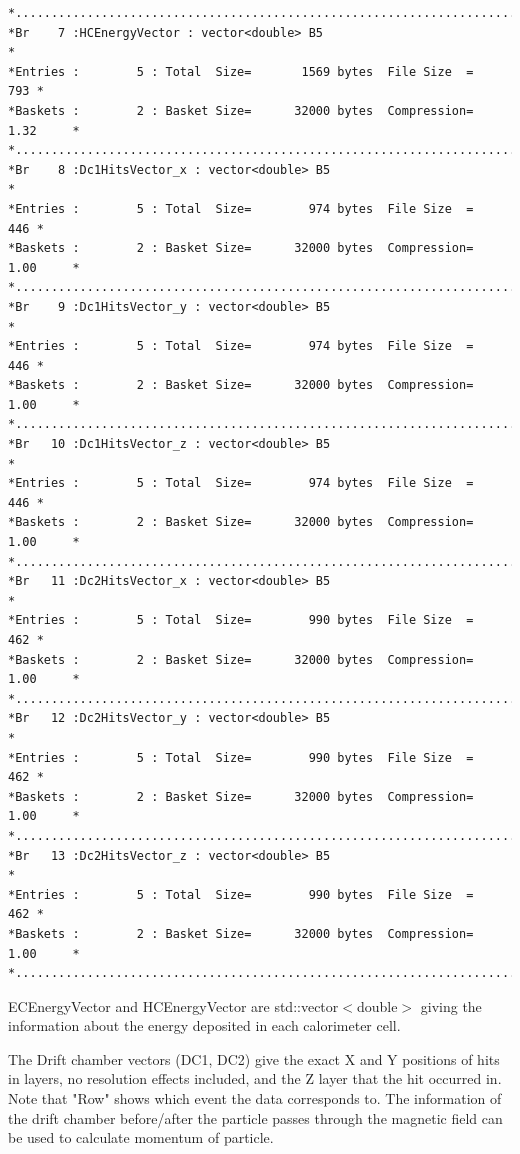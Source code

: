 \documentclass[a4paper,11pt,twoside]{article}
\begin{document}
\begin{lstlisting}
*............................................................................*
*Br    7 :HCEnergyVector : vector<double> B5                                 *
*Entries :        5 : Total  Size=       1569 bytes  File Size  =        793 *
*Baskets :        2 : Basket Size=      32000 bytes  Compression=   1.32     *
*............................................................................*
*Br    8 :Dc1HitsVector_x : vector<double> B5                                *
*Entries :        5 : Total  Size=        974 bytes  File Size  =        446 *
*Baskets :        2 : Basket Size=      32000 bytes  Compression=   1.00     *
*............................................................................*
*Br    9 :Dc1HitsVector_y : vector<double> B5                                *
*Entries :        5 : Total  Size=        974 bytes  File Size  =        446 *
*Baskets :        2 : Basket Size=      32000 bytes  Compression=   1.00     *
*............................................................................*
*Br   10 :Dc1HitsVector_z : vector<double> B5                                *
*Entries :        5 : Total  Size=        974 bytes  File Size  =        446 *
*Baskets :        2 : Basket Size=      32000 bytes  Compression=   1.00     *
*............................................................................*
*Br   11 :Dc2HitsVector_x : vector<double> B5                                *
*Entries :        5 : Total  Size=        990 bytes  File Size  =        462 *
*Baskets :        2 : Basket Size=      32000 bytes  Compression=   1.00     *
*............................................................................*
*Br   12 :Dc2HitsVector_y : vector<double> B5                                *
*Entries :        5 : Total  Size=        990 bytes  File Size  =        462 *
*Baskets :        2 : Basket Size=      32000 bytes  Compression=   1.00     *
*............................................................................*
*Br   13 :Dc2HitsVector_z : vector<double> B5                                *
*Entries :        5 : Total  Size=        990 bytes  File Size  =        462 *
*Baskets :        2 : Basket Size=      32000 bytes  Compression=   1.00     *
*............................................................................*
\end{lstlisting}
ECEnergyVector and HCEnergyVector are std::vector$<$double$>$ giving the information about the energy deposited in each calorimeter cell.

The Drift chamber vectors (DC1, DC2) give the exact X and Y positions of hits in layers, no resolution effects included, and the Z layer that the hit occurred in.
Note that "Row" shows which event the data corresponds to.
The information of the drift chamber before/after the particle passes through the magnetic field can be used to calculate momentum of particle.
\end{document}
